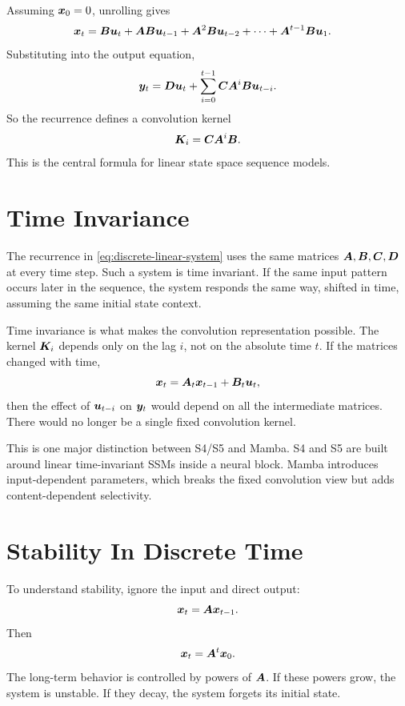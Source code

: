 Assuming $\bm{x}_0=0$, unrolling gives
\[
\begin{aligned}
  \bm{x}_t
  &=
  \bm{B} \bm{u}_t
  +
  \bm{A} \bm{B} \bm{u}_{t-1}
  +
  \bm{A}^2 \bm{B} \bm{u}_{t-2}
  + \cdots
  +
  \bm{A}^{t-1}\bm{B} \bm{u}_1.
\end{aligned}
\]
Substituting into the output equation,
\begin{equation}
  \bm{y}_t
  =
  \bm{D}\bm{u}_t
  +
  \sum_{i=0}^{t-1} \bm{C} \bm{A}^i \bm{B} \bm{u}_{t-i}.
  \label{eq:ssm-convolution-unrolled}
\end{equation}
So the recurrence defines a convolution kernel
\begin{equation}
  \bm{K}_i = \bm{C} \bm{A}^i \bm{B}.
  \label{eq:linear-system-kernel}
\end{equation}
This is the central formula for linear state space sequence models.

\section{Time Invariance}

The recurrence in \eqref{eq:discrete-linear-system} uses the same matrices
$\bm{A},\bm{B},\bm{C},\bm{D}$ at every time step. Such a system is time invariant. If the same input
pattern occurs later in the sequence, the system responds the same way, shifted in time,
assuming the same initial state context.

Time invariance is what makes the convolution representation possible. The kernel
$\bm{K}_i$ depends only on the lag $i$, not on the absolute time $t$. If the matrices changed
with time,
\[
  \bm{x}_t = \bm{A}_t \bm{x}_{t-1} + \bm{B}_t \bm{u}_t,
\]
then the effect of $\bm{u}_{t-i}$ on $\bm{y}_t$ would depend on all the intermediate matrices.
There would no longer be a single fixed convolution kernel.

This is one major distinction between S4/S5 and Mamba. S4 and S5 are built around linear
time-invariant SSMs inside a neural block. Mamba introduces input-dependent parameters,
which breaks the fixed convolution view but adds content-dependent selectivity.

\section{Stability In Discrete Time}

To understand stability, ignore the input and direct output:
\[
  \bm{x}_t = \bm{A} \bm{x}_{t-1}.
\]
Then
\[
  \bm{x}_t = \bm{A}^t \bm{x}_0.
\]
The long-term behavior is controlled by powers of $\bm{A}$. If these powers grow, the system
is unstable. If they decay, the system forgets its initial state.

